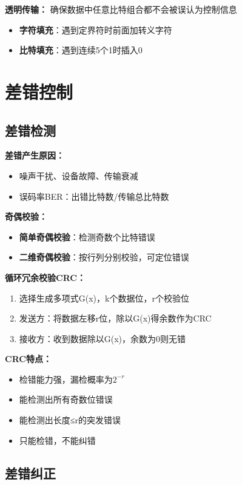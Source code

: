 \documentclass[lang=cn,newtx,10pt,scheme=chinese]{../../elegantbook}
\begin{document}
\textbf{透明传输：}
确保数据中任意比特组合都不会被误认为控制信息
\begin{itemize}
  \item \textbf{字符填充}：遇到定界符时前面加转义字符
  \item \textbf{比特填充}：遇到连续5个1时插入0
\end{itemize}

\section{差错控制}

\subsection{差错检测}

\textbf{差错产生原因：}
\begin{itemize}
  \item 噪声干扰、设备故障、传输衰减
  \item 误码率BER：出错比特数/传输总比特数
\end{itemize}

\textbf{奇偶校验：}
\begin{itemize}
  \item \textbf{简单奇偶校验}：检测奇数个比特错误
  \item \textbf{二维奇偶校验}：按行列分别校验，可定位错误
\end{itemize}

\textbf{循环冗余校验CRC：}
\begin{enumerate}
  \item 选择生成多项式G(x)，k个数据位，r个校验位
  \item 发送方：将数据左移r位，除以G(x)得余数作为CRC
  \item 接收方：收到数据除以G(x)，余数为0则无错
\end{enumerate}

\textbf{CRC特点：}
\begin{itemize}
  \item 检错能力强，漏检概率为$2^{-r}$
  \item 能检测出所有奇数位错误
  \item 能检测出长度≤r的突发错误
  \item 只能检错，不能纠错
\end{itemize}

\subsection{差错纠正}
\end{document}
